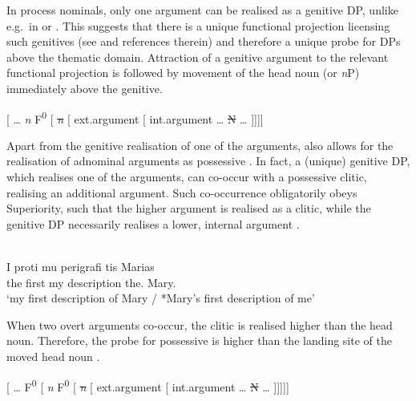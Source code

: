 \documentclass[output=paper]{langsci/langscibook}
\begin{document}
In  process nominals, only one argument can be realised as a genitive DP,
unlike e.g.\ in  or . This suggests that there is a
unique functional projection licensing such genitives (see
\citealt{AleHaeSta2007} and references therein) and therefore a unique probe
for DPs above the thematic domain. Attraction of a genitive argument to the
relevant functional projection is followed by movement of the head noun (or
\emph{n}P) immediately above the genitive.

\ea%
    \label{ex:22.41}
    {}[ \dots{}\tss{} \emph{n} F\tss{\Gen{}}\textsuperscript{0}
        [ \sout{\emph{n}}
            [  ext.argument [ int.argument \dots{} \sout{N} \dots{} ]]]]
\z

Apart from the genitive realisation of one of the arguments,  also allows
for the realisation of adnominal arguments as possessive . In fact, a
(unique) genitive DP, which realises one of the arguments, can co-occur with a
possessive clitic, realising an additional argument. Such co-occurrence
obligatorily obeys Superiority, such that the higher argument is realised as a
clitic, while the genitive DP necessarily realises a lower, internal argument
.

\ea%
    \label{ex:22.42}\\
    \gll    I  proti  mu  perigrafi  tis    Marias\\
            the  first  my   description  the.\Gen{}  Mary.\Gen{}\\
    \glt    \enquote*{my first description of Mary / *Mary’s first description of me}
\z

When two overt arguments co-occur, the clitic is realised higher than the head
noun. Therefore, the probe for possessive  is higher than the landing
site of the moved head noun .

\ea%
    \label{ex:22.43}
    {}[ \dots{} F\tss{\Poss\Cl{}}\textsuperscript{0}
        [ \emph{n} F\tss{\Gen{}}\textsuperscript{0}
            [ \sout{\emph{n}} [  ext.argument
                [ int.argument  \dots{}  \sout{N} \dots{} ]]]]]
\z
\end{document}
